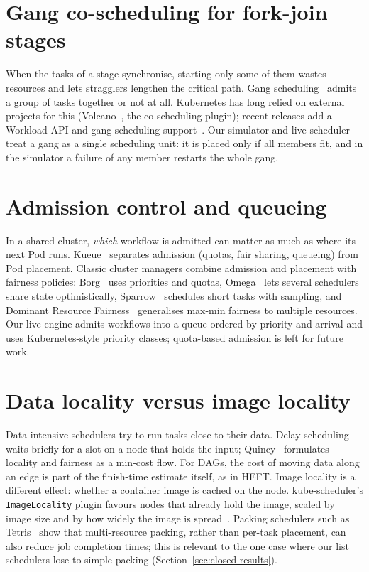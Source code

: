\documentclass[12pt,a4paper]{report}
\begin{document}
\section{Gang co-scheduling for fork-join stages}

When the tasks of a stage synchronise, starting only some of them wastes
resources and lets stragglers lengthen the critical path. Gang
scheduling~\cite{feitelson1992gang} admits a group of tasks together or
not at all. Kubernetes has long relied on external projects for this
(Volcano~\cite{volcano}, the co-scheduling plugin); recent releases add a
Workload API and gang scheduling support~\cite{k8s-workload-api,
k8s-gang,k8s-wa-blog}. Our simulator and live scheduler treat a gang as a
single scheduling unit: it is placed only if all members fit, and in the
simulator a failure of any member restarts the whole gang.

\section{Admission control and queueing}

In a shared cluster, \emph{which} workflow is admitted can matter as much
as where its next Pod runs. Kueue~\cite{kueue-blog,kueue-docs} separates
admission (quotas, fair sharing, queueing) from Pod placement. Classic
cluster managers combine admission and placement with fairness policies:
Borg~\cite{verma2015borg} uses priorities and quotas, Omega~\cite{
schwarzkopf2013omega} lets several schedulers share state optimistically,
Sparrow~\cite{ousterhout2013sparrow} schedules short tasks with sampling,
and Dominant Resource Fairness~\cite{ghodsi2011drf} generalises max-min
fairness to multiple resources. Our live engine admits workflows into a
queue ordered by priority and arrival and uses Kubernetes-style priority
classes; quota-based admission is left for future work.

\section{Data locality versus image locality}

Data-intensive schedulers try to run tasks close to their data. Delay
scheduling~\cite{zaharia2010delay} waits briefly for a slot on a node that
holds the input; Quincy~\cite{isard2009quincy} formulates locality and
fairness as a min-cost flow. For DAGs, the cost of moving data along an
edge is part of the finish-time estimate itself, as in HEFT. Image
locality is a different effect: whether a container image is cached on the
node. kube-scheduler's \texttt{ImageLocality} plugin favours nodes that
already hold the image, scaled by image size and by how widely the image
is spread~\cite{kubernetes-config}. Packing schedulers such as
Tetris~\cite{grandl2014tetris} show that multi-resource packing, rather
than per-task placement, can also reduce job completion times; this is
relevant to the one case where our list schedulers lose to simple packing
(Section~\ref{sec:closed-results}).
\end{document}
